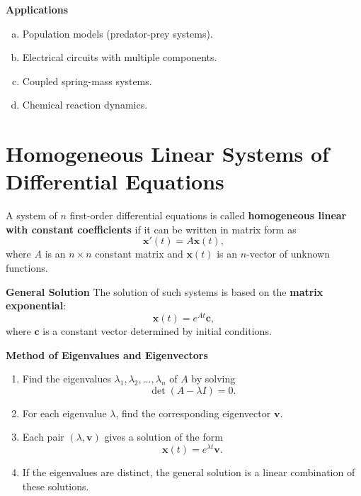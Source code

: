

    \textbf{Applications}
    \begin{enumerate}[(a)]
      \item Population models (predator-prey systems).
      \item Electrical circuits with multiple components.
      \item Coupled spring-mass systems.
      \item Chemical reaction dynamics.
    \end{enumerate}

    
  \section{Homogeneous Linear Systems of Differential Equations}
    \begin{definition}
      A system of $n$ first-order differential equations is called \textbf{homogeneous linear with constant coefficients} if it can be written in matrix form as
      \[
      \mathbf{x}'(t) = A \mathbf{x}(t),
      \]
      where $A$ is an $n \times n$ constant matrix and $\mathbf{x}(t)$ is an $n$-vector of unknown functions.
    \end{definition}
    
    \textbf{General Solution}
    The solution of such systems is based on the \textbf{matrix exponential}:
    \[
    \mathbf{x}(t) = e^{At} \mathbf{c},
    \]
    where $\mathbf{c}$ is a constant vector determined by initial conditions.

    \textbf{Method of Eigenvalues and Eigenvectors}
    \begin{enumerate}
      \item Find the eigenvalues $\lambda_1, \lambda_2, \dots, \lambda_n$ of $A$ by solving
      \[
      \det(A - \lambda I) = 0.
      \]
      \item For each eigenvalue $\lambda$, find the corresponding eigenvector $\mathbf{v}$.
      \item Each pair $(\lambda, \mathbf{v})$ gives a solution of the form
      \[
      \mathbf{x}(t) = e^{\lambda t} \mathbf{v}.
      \]
      \item If the eigenvalues are distinct, the general solution is a linear combination of these solutions.
    \end{enumerate}

